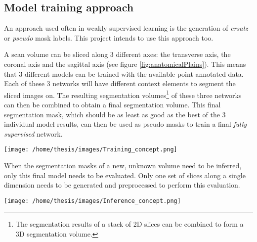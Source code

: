 \subsection{Model training approach}

An approach used often in weakly supervised learning is the generation of \textit{ersatz} or \textit{pseudo} mask labels.
This project intends to use this approach too.

A scan volume can be sliced along 3 different axes: the transverse axis, the coronal axis and the sagittal axis (see figure \ref{fig:anatomicalPlains}). 
This means that 3 different models can be trained with the available point annotated data. 
Each of these 3 networks will have different context elements to segment the sliced images on.
The resulting segmentation volumes\footnote{The segmentation results of a stack of 2D slices can be combined to form a 3D segmentation volume.} of these three networks can then be combined to obtain a final segmentation volume.
This final segmentation mask, which should be as least as good as the best of the 3 individual model results, can then be used as pseudo masks to train a final \textit{fully supervised} network. 

\begin{SCfigure}[][htb]
    \centering
    \texttt{[image: /home/thesis/images/Training\_concept.png]}
    \caption{\label{fig:model_training_concept}Illustration of the model training approach. 
    This is based on the conbination of 3 different models based on different volume slices.}
\end{SCfigure}

When the segmentation masks of a new, unknown volume need to be inferred, only this final model needs to be evaluated.
Only one set of slices along a single dimension needs to be generated and preprocessed to perform this evaluation.

\begin{SCfigure}[][htb]
    \centering
    \texttt{[image: /home/thesis/images/Inference\_concept.png]}
    \caption{Inference step. Only one model needs to be evaluated in this step, the model that is trianed in the final step of the training procedure illustrated in figure \ref{fig:model_training_concept}.}
\end{SCfigure}